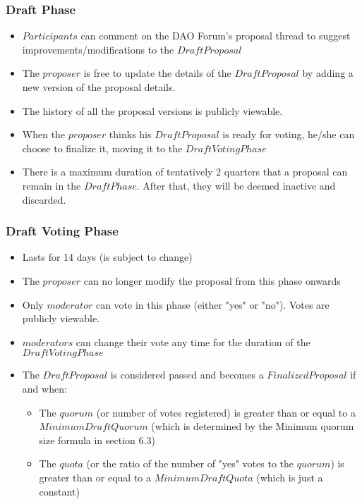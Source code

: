 \documentclass[11pt,a4paper,titlepage]{article}
\begin{document}
{{		\subsubsection{Draft Phase}{
			\begin{itemize}
				\item $Participants$ can comment on the DAO Forum’s proposal thread to suggest improvements/modifications to the $Draft Proposal$
				\item The $proposer$ is free to update the details of the $Draft Proposal$ by adding a new version of the proposal details.
				\item The history of all the proposal versions is publicly viewable.
				\item When the $proposer$ thinks his $Draft Proposal$ is ready for voting, he/she can choose to finalize it, moving it to the $Draft Voting Phase$
				\item There is a maximum duration of tentatively 2 quarters that a proposal can remain in the $Draft Phase$. After that, they will be deemed inactive and discarded.
			\end{itemize}
		}
		\subsubsection{Draft Voting Phase}{
			\begin{itemize}
				\item Lasts for 14 days (is subject to change)
				\item The $proposer$ can no longer modify the proposal from this phase onwards
				\item Only $moderator$ can vote in this phase (either "yes" or "no"). Votes are publicly viewable.
				\item $moderators$ can change their vote any time for the duration of the $Draft Voting Phase$
				\item The $DraftProposal$ is considered passed and becomes a $Finalized Proposal$ if and when:
				\begin{itemize}
					\item The $quorum$ (or number of votes registered) is greater than or equal to a $Minimum Draft Quorum$ (which is determined by the Minimum quorum size formula in section $6.3$)
					\item The $quota$ (or the ratio of the number of "yes" votes to the $quorum$) is greater than or equal to a $Minimum Draft Quota$ (which is just a constant)
				\end{itemize}
			\end{itemize}
		}
}}
\end{document}
